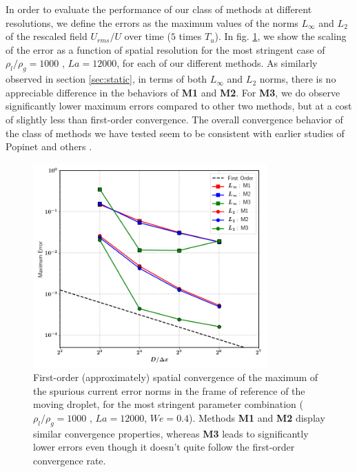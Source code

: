 In order to evaluate the performance of our class of methods at different resolutions, we define the errors as the maximum values of the norms $L_\infty$ and $L_2$ of the rescaled field $U_{rms}/U$ over time ($5$ times $T_u$). In fig. \ref{moving_drop_conv}, we show the scaling of the error as a function of spatial resolution for the most stringent case of $\rho_l/\rho_g = 1000 $ , $La = 12000$, for each of our different methods. As similarly observed in section \ref{sec:static}, in terms of both $L_\infty$ and $L_2$ norms, there is no appreciable difference in the behaviors of \textbf{M1} and \textbf{M2}. For \textbf{M3}, we do observe significantly lower maximum errors compared to other two methods, but at a cost of slightly less than first-order convergence. The overall convergence behavior of the class of methods we have tested seem to be consistent with earlier studies of Popinet \cite{popinet2009accurate} and others  .  

\begin{figure}[h!]
    \centering
    \includegraphics[width = 0.8\textwidth]{plots/droplet_advect/convergence_all.png}
	\caption{First-order (approximately) spatial convergence of the maximum of the spurious current error norms in the frame of reference of the moving droplet, for the most stringent parameter combination ($\rho_l/\rho_g = 1000 $ , $La = 12000$, $We = 0.4$). Methods \textbf{M1} and \textbf{M2} display similar convergence properties, whereas \textbf{M3} leads to significantly lower errors even though it doesn't quite follow the first-order convergence rate. }   
    \label{moving_drop_conv}
\end{figure}

